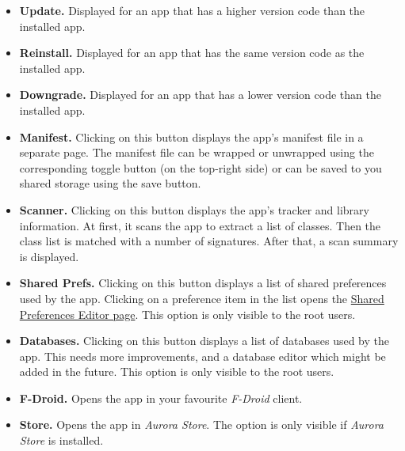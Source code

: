 \begin{itemize}
    \item \textbf{Update.} Displayed for an app that has a higher version code than the installed app.

    \item \textbf{Reinstall.} Displayed for an app that has the same version code as the installed app.

    \item \textbf{Downgrade.} Displayed for an app that has a lower version code than the installed app.

    \item \textbf{Manifest.} Clicking on this button displays the app's manifest file in a separate page. The manifest
    file can be wrapped or unwrapped using the corresponding toggle button (on the top-right side) or can be saved to
    you shared storage using the save button.

    \item \textbf{Scanner.} Clicking on this button displays the app's tracker and library information. At first, it
    scans the app to extract a list of classes. Then the class list is matched with a number of signatures. After that,
    a scan summary is displayed.\\

    \item \textbf{Shared Prefs.} Clicking on this button displays a list of shared preferences used by the app. Clicking
    on a preference item in the list opens the \hyperref[sec:shared-preferences-editor-page]{Shared Preferences Editor
    page}. This option is only visible to the root users.

    \item \textbf{Databases.} Clicking on this button displays a list of databases used by the app. This needs more
    improvements, and a database editor which might be added in the future. This option is only visible to the root users.

    \item \textbf{F-Droid.} Opens the app in your favourite \textit{F-Droid} client.

    \item \textbf{Store.} Opens the app in \textit{Aurora Store}. The option is only visible if \textit{Aurora Store} is
    installed.
\end{itemize}

